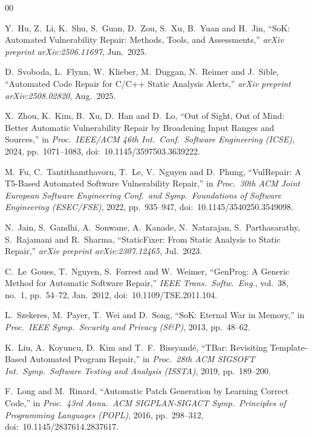 \begin{thebibliography}{00}

Y.~Hu, Z.~Li, K.~Shu, S.~Guan, D.~Zou, S.~Xu, B.~Yuan and H.~Jin,
``SoK: Automated Vulnerability Repair: Methods, Tools, and Assessments,''
\textit{arXiv preprint arXiv:2506.11697}, Jun.\ 2025.

D.~Svoboda, L.~Flynn, W.~Klieber, M.~Duggan, N.~Reimer and J.~Sible,
``Automated Code Repair for C/C++ Static Analysis Alerts,''
\textit{arXiv preprint arXiv:2508.02820}, Aug.\ 2025.

X.~Zhou, K.~Kim, B.~Xu, D.~Han and D.~Lo,
``Out of Sight, Out of Mind: Better Automatic Vulnerability Repair by Broadening
Input Ranges and Sources,''
in \textit{Proc.\ IEEE/ACM 46th Int.\ Conf.\ Software Engineering (ICSE)}, 2024,
pp.~1071--1083, doi:~10.1145/3597503.3639222.

M.~Fu, C.~Tantithamthavorn, T.~Le, V.~Nguyen and D.~Phung,
``VulRepair: A T5-Based Automated Software Vulnerability Repair,''
in \textit{Proc.\ 30th ACM Joint European Software Engineering Conf.\ and
Symp.\ Foundations of Software Engineering (ESEC/FSE)}, 2022,
pp.~935--947, doi:~10.1145/3540250.3549098.

N.~Jain, S.~Gandhi, A.~Sonwane, A.~Kanade, N.~Natarajan,
S.~Parthasarathy, S.~Rajamani and R.~Sharma,
``StaticFixer: From Static Analysis to Static Repair,''
\textit{arXiv preprint arXiv:2307.12465}, Jul.\ 2023.

C.~Le~Goues, T.~Nguyen, S.~Forrest and W.~Weimer,
``GenProg: A Generic Method for Automatic Software Repair,''
\textit{IEEE Trans.\ Softw.\ Eng.}, vol.~38, no.~1, pp.~54--72, Jan.\ 2012,
doi:~10.1109/TSE.2011.104.

L.~Szekeres, M.~Payer, T.~Wei and D.~Song,
``SoK: Eternal War in Memory,''
in \textit{Proc.\ IEEE Symp.\ Security and Privacy (S\&P)}, 2013,
pp.~48--62.

K.~Liu, A.~Koyuncu, D.~Kim and T.~F.~Bissyand\'{e},
``TBar: Revisiting Template-Based Automated Program Repair,''
in \textit{Proc.\ 28th ACM SIGSOFT Int.\ Symp.\ Software Testing
and Analysis (ISSTA)}, 2019, pp.~189--200.

F.~Long and M.~Rinard,
``Automatic Patch Generation by Learning Correct Code,''
in \textit{Proc.\ 43rd Annu.\ ACM SIGPLAN-SIGACT Symp.\ Principles of
Programming Languages (POPL)}, 2016, pp.~298--312,
doi:~10.1145/2837614.2837617.

\end{thebibliography}
